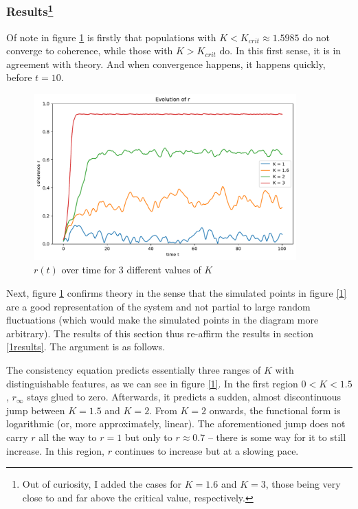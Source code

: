 \documentclass[11pt,a4paper]{article}
\newcommand{\graph}{\medskip\noindent}
\begin{document}
\subsubsection{Results\footnote{Out of curiosity, I added the cases for $K=1.6$ and $K=3$, those being very close to and far above the critical value, respectively.}}

Of note in figure \ref{2} is firstly that populations with $K<K_{crit} \approx 1.5985$ do not converge to coherence, while those with $K>K_{crit}$ do. 
In this first sense, it is in agreement with theory. 
And when convergence happens, it happens quickly, before $t = 10$.

\begin{figure}[h]
	\centering
	\includegraphics[width=0.9\textwidth]{graphics/2_t-vs-r_omegaDistr=normal_N=1000_1611744007.pdf}
	\caption{$r(t)$ over time for 3 different values of $K$}
	\label{2}
\end{figure}


\graph
Next, figure \ref{2} confirms theory in the sense that the simulated points in figure \ref{1} are a good representation of the system and not partial to large random fluctuations (which would make the simulated points in the diagram more arbitrary).
The results of this section thus re-affirm the results in section \ref{1results}. 
The argument is as follows.

The consistency equation predicts essentially three ranges of $K$ with distinguishable features, as we can see in figure \ref{1}.
In the first region $0<K<1.5$, $r_\infty$ stays glued to zero. 
Afterwards, it predicts a sudden, almost discontinuous jump between $K=1.5$ and $K=2$. 
From $K=2$ onwards, the functional form is logarithmic (or, more approximately, linear).
The aforementioned jump does not carry $r$ all the way to $r=1$ but only to $r\approx 0.7$ -- there is some way for it to still increase. 
In this region, $r$ continues to increase but at a slowing pace. 
\end{document}
